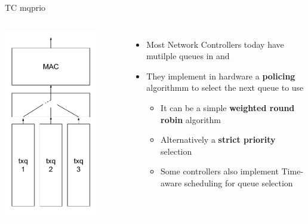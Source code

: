 \begin{frame}{TC mqprio}
	\begin{columns}
		\includegraphics[width=0.8\textwidth]{slides/networking-traffic-control/txq_mq.pdf}
	\begin{itemize}
		\item Most Network Controllers today have mutilple queues in  and 
		\item They implement in hardware a \textbf{policing} algorithmm to select the next  queue to use
			\begin{itemize}
				\item It can be a simple \textbf{weighted round robin} algorithm
				\item Alternatively a \textbf{strict priority} selection
				\item Some controllers also implement Time-aware scheduling for queue selection
			\end{itemize}
	\end{itemize}
	\end{columns}
\end{frame}

